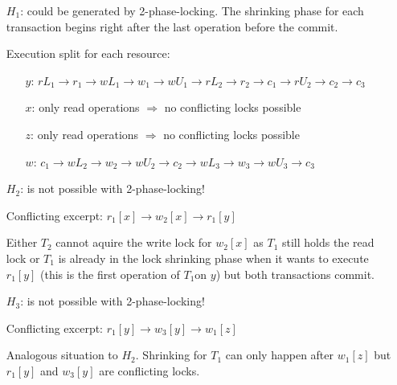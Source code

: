 \documentclass{scrartcl}
\begin{document}
\begin{itemize}
    \item[\(H_1\):] could be generated by 2-phase-locking. 
    The shrinking phase for each transaction begins right after the last operation before the commit.

        Execution split for each resource:

        \begin{itemize}
            \item[\(y\):] \(rL_1 \rightarrow r_1 \rightarrow wL_1 \rightarrow w_1 \rightarrow wU_1 \rightarrow rL_2 \rightarrow r_2 \rightarrow c_1 \rightarrow rU_2 \rightarrow c_2 \rightarrow c_3\)
            \item[\(x\):] only read operations $\Rightarrow$ no conflicting locks possible
            \item[\(z\):] only read operations $\Rightarrow$ no conflicting locks possible
            \item[\(w\):] \(c_1 \rightarrow wL_2 \rightarrow w_2 \rightarrow wU_2 \rightarrow c_2 \rightarrow wL_3 \rightarrow w_3 \rightarrow wU_3 \rightarrow c_3\)
        \end{itemize}

    \item[\(H_2\):] is not possible with 2-phase-locking!

        Conflicting excerpt: \(r_1[x] \rightarrow w_2[x] \rightarrow r_1[y]\)

        Either \(T_2\) cannot aquire the write lock for \(w_2[x]\) as \(T_1\) still holds the read lock or \(T_1\) is already in the lock shrinking phase when it wants to execute \(r_1[y]\) (this is the first operation of \(T_1\)on \(y\)) but both transactions commit.

    \item[\(H_3\):] is not possible with 2-phase-locking!

        Conflicting excerpt: \(r_1[y] \rightarrow w_3[y] \rightarrow w_1[z]\)

        Analogous situation to \(H_2\).
        Shrinking for \(T_1\) can only happen after \(w_1[z]\) but \(r_1[y]\) and \(w_3[y]\) are conflicting locks.


\end{itemize}
\end{document}
